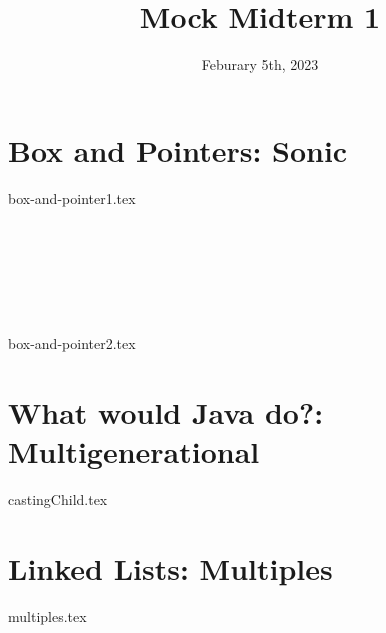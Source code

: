 \documentclass[11pt]{exam}
\title{Mock Midterm 1}
\date{Feburary 5th, 2023}
\begin{document}
\maketitle


\section{Box and Pointers: Sonic}

\begin{questions}
{box-and-pointer1.tex}
\end{questions}


\\
\\
\\
\\
\\
\clearpage

\begin{questions}
{box-and-pointer2.tex}
\end{questions}


\clearpage


\section{What would Java do?: Multigenerational}

\begin{questions}
{castingChild.tex} 
\end{questions}

\clearpage



\section{Linked Lists: Multiples}

\begin{questions}
{multiples.tex}
\end{questions}
\end{document}
